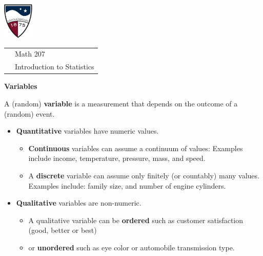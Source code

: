 \documentclass[10pt]{article}
\begin{document}
\pagestyle{empty}
\lstset{language=R, showspaces=false, showstringspaces=false}

\href{http://www.su.edu}{\includegraphics[height=1.75cm]{sulogo.eps}}
\vspace{-1.69cm}

{\small \hfill
\begin{tabular}{cl}
& Math 207\\& Introduction to Statistics\\
\end{tabular}
}
\setlength{\baselineskip}{1.05\baselineskip}
\medskip
\medskip

\begin{center}
\textbf{\large  Variables}
\end{center}

\newcommand{\SUBX}{\smallskip\hspace{10pt}}
\newcommand{\BSK}{\vspace{.14in}}

A (random) \textbf{variable} is a measurement that depends on the outcome 
   of a (random) event.
\begin{itemize}
\item \textbf{Quantitative} variables have numeric values.  
  \begin{itemize} 
     \item \textbf{Continuous} variables can assume a continuum of values:  Examples include 
      income, temperature, pressure, mass, and speed. 
     \item A \textbf{discrete} variable can assume only finitely (or countably) many values.
       Examples include: family size, and number of engine cylinders.\vspace{2pt}
  \end{itemize}
\item \textbf{Qualitative} variables are non-numeric.  
   \begin{itemize}
      \item A qualitative variable can be \textbf{ordered} such as customer 
          satisfaction (good, better or best)
      \item or \textbf{unordered} such as eye color or automobile transmission type.
   \end{itemize}
\end{itemize}
\end{document}

